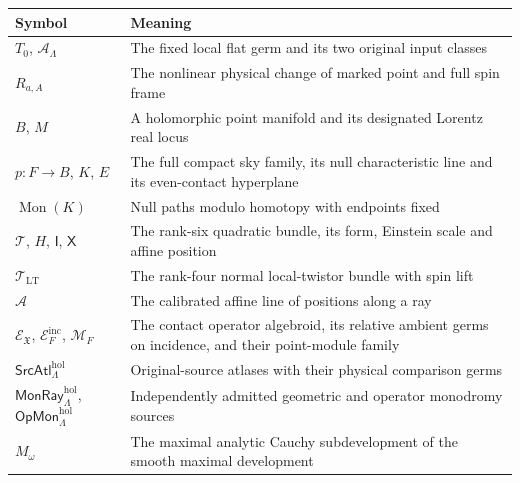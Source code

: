 \documentclass[
  english,
  11pt,
  reqno]{amsart}
\newcounter{none} %
\begin{document}
{\def\LTcaptype{none} %
\begin{longtable}[]{@{}
  >{\raggedright\arraybackslash}p{}
  >{\raggedright\arraybackslash}p{}@{}}
\toprule\noalign{}
\begin{minipage}[b]{\linewidth}\raggedright
Symbol
\end{minipage} & \begin{minipage}[b]{\linewidth}\raggedright
Meaning
\end{minipage} \\
\midrule\noalign{}
\endhead
\bottomrule\noalign{}
\endlastfoot
\(T_0\), \(\mathcal A_\Lambda\) & The fixed local flat germ and its two
original input classes \\
\(R_{a,A}\) & The nonlinear physical change of marked point and full
spin frame \\
\(B\), \(M\) & A holomorphic point manifold and its designated Lorentz
real locus \\
\(p:F\to B\), \(K\), \(E\) & The full compact sky family, its null
characteristic line and its even-contact hyperplane \\
\(\operatorname{Mon}(K)\) & Null paths modulo homotopy with endpoints
fixed \\
\(\mathcal T\), \(H\), \(\mathsf I\), \(\mathsf X\) & The rank-six
quadratic bundle, its form, Einstein scale and affine position \\
\(\mathcal T_{\mathrm{LT}}\) & The rank-four normal local-twistor bundle
with spin lift \\
\(\mathscr A\) & The calibrated affine line of positions along a ray \\
\(\mathscr E_{\mathfrak X}\), \(\mathscr E_F^{\mathrm{inc}}\),
\(\mathscr M_F\) & The contact operator algebroid, its relative ambient
germs on incidence, and their point-module family \\
\(\mathsf{SrcAtl}^{\mathrm{hol}}_\Lambda\) & Original-source atlases
with their physical comparison germs \\
\(\mathsf{MonRay}^{\mathrm{hol}}_\Lambda\),
\(\mathsf{OpMon}^{\mathrm{hol}}_\Lambda\) & Independently admitted
geometric and operator monodromy sources \\
\(M_\omega\) & The maximal analytic Cauchy subdevelopment of the smooth
maximal development \\
\end{longtable}
}

\protect{}\label{tab:local-dependencies-v095}
\end{document}
